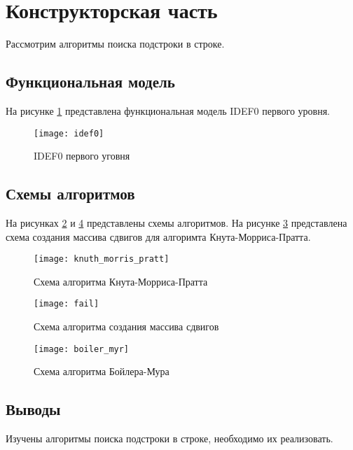 \newpage
\section{Конструкторская часть}

Рассмотрим алгоритмы поиска подстроки в строке.

\subsection{Функциональная модель}

На рисунке \ref{img:idef0} представлена функциональная модель IDEF0
первого уровня.

\begin{figure}[H]
    \centering
    \texttt{[image: idef0]}
    \caption{IDEF0 первого уговня}
    \label{img:idef0}
\end{figure}

\subsection{Схемы алгоритмов}

На рисунках \ref{img:kmp} и \ref{img:bm} представлены схемы алгоритмов.
На рисунке \ref{img:fail} представлена схема создания массива сдвигов
для алгоримта Кнута-Морриса-Пратта.

\begin{figure}[H]
    \centering
    \texttt{[image: knuth\_morris\_pratt]}
    \caption{Схема алгоритма Кнута-Морриса-Пратта}
    \label{img:kmp}
\end{figure}

\begin{figure}[H]
    \centering
    \texttt{[image: fail]}
    \caption{Схема алгоритма создания массива сдвигов}
    \label{img:fail}
\end{figure}

\begin{figure}[H]
    \centering
    \texttt{[image: boiler\_myr]}
    \caption{Схема алгоритма Бойлера-Мура}
    \label{img:bm}
\end{figure}

\subsection{Выводы}

Изучены алгоритмы поиска подстроки в строке, необходимо их реализовать.

